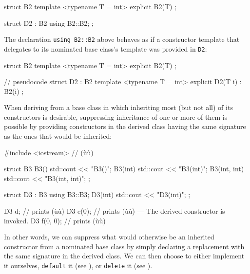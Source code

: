 \begin{emcppslisting}
struct B2
{
    template <typename T = int>
    explicit B2(T) { }
};

struct D2 : B2 { using B2::B2; };
\end{emcppslisting}
    
\noindent The declaration \lstinline!using!~\lstinline!B2::B2! above behaves as if a
constructor template that delegates to its nominated base class's
template was provided in \lstinline!D2!:

\begin{emcppshiddenlisting}[emcppsbatch=e2]
struct B2
{
    template <typename T = int>
    explicit B2(T) { }
};
\end{emcppshiddenlisting}
\begin{emcppslisting}[emcppsbatch=e2]
// pseudocode
struct D2 : B2
{
    template <typename T = int>
    explicit D2(T i) : B2(i) { }
};
\end{emcppslisting}
    
\noindent When deriving from a base class in which inheriting most
(but not all) of its constructors is desirable, suppressing
inheritance of one or more of them is possible by providing constructors in the
derived class having the same signature as the ones that would be
inherited:

\begin{emcppshiddenlisting}[emcppsbatch=e3]
#include <iostream>  // (ù{}ù)
\end{emcppshiddenlisting}
\begin{emcppslisting}[emcppsbatch=e3]
struct B3
{
    B3()         { std::cout << "B3()\n"; }
    B3(int)      { std::cout << "B3(int)\n"; }
    B3(int, int) { std::cout << "B3(int, int)\n"; }
};

struct D3 : B3
{
    using B3::B3;
    D3(int) { std::cout << "D3(int)\n"; }
};

D3 d;        // prints (ù{}ù)
D3 e(0);     // prints (ù{}ù) --- The derived constructor is invoked.
D3 f(0, 0);  // prints (ù{}ù)
\end{emcppslisting}
    
\noindent In other words, we can suppress what would otherwise be an inherited
constructor from a nominated base class by simply declaring a
replacement with the same signature in the derived class. We can then
choose to either implement it ourselves, \lstinline!default! it (see ), 
or \lstinline!delete! it (see ). 

